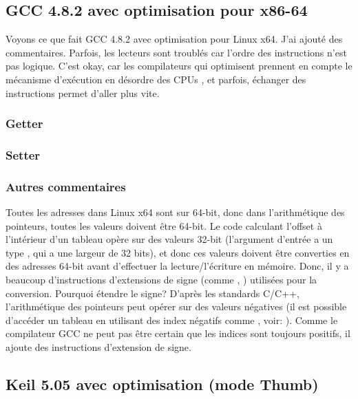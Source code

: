 \subsection{GCC 4.8.2 avec optimisation pour x86-64}

Voyons ce que fait GCC 4.8.2 avec optimisation pour Linux x64.
J'ai ajouté des commentaires.
Parfois, les lecteurs sont troublés car l'ordre des instructions n'est pas logique.
C'est okay, car les compilateurs qui optimisent prennent en compte le mécanisme d'exécution
en désordre des CPUs , et parfois,  échanger des instructions permet d'aller plus vite.

\subsubsection{Getter}



\subsubsection{Setter}



\subsubsection{Autres commentaires}

Toutes les adresses dans Linux x64 sont sur 64-bit, donc dans l'arithmétique des
pointeurs, toutes les valeurs doivent être 64-bit.
Le code calculant l'offset à l'intérieur d'un  tableau opère sur des valeurs 32-bit
(l'argument d'entrée  a un type , qui a une largeur de 32 bits),
et donc ces valeurs doivent être converties en des adresses 64-bit avant d'effectuer
la lecture/l'écriture en mémoire.
Donc, il y a beaucoup d'instructions d'extensions de signe (comme , )
utilisées pour la conversion.
Pourquoi étendre le signe? D'après les standards C/C++, l'arithmétique des pointeurs
peut opérer sur des valeurs négatives (il est possible d'accéder un tableau en utilisant
des index négatifs comme , voir: ).
Comme le compilateur GCC ne peut pas être certain que les indices sont toujours positifs,
il ajoute des instructions d'extension de signe.

\subsection{Keil 5.05 avec optimisation (mode Thumb)}

